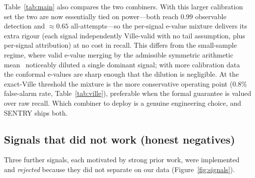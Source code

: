 \documentclass[10pt,journal,compsoc]{IEEEtran}
\theoremstyle{plain}
\theoremstyle{definition}
\begin{document}
Table~\ref{tab:main} also compares the two combiners. With this larger
calibration set the two are now essentially tied on power---both reach
\(0.99\) observable detection and \(\approx\!0.65\) all-attempts---so the
per-signal e-value mixture delivers its extra rigour (each signal
independently Ville-valid with no tail assumption, plus per-signal
attribution) at no cost in recall. This differs from the small-sample regime,
where valid e-value merging by the admissible symmetric arithmetic
mean~\cite{vovk2021evalues} noticeably diluted a single dominant signal; with
more calibration data the conformal e-values are sharp enough that the
dilution is negligible. At the exact-Ville threshold the mixture is the more
conservative operating point (\(0.8\%\) false-alarm rate, Table~\ref{tab:ville}),
preferable when the formal guarantee is valued over raw recall. Which combiner
to deploy is a genuine engineering choice, and SENTRY ships both.

\subsection{Signals that did not work (honest negatives)}\label{sec:negatives}

Three further signals, each motivated by strong prior work, were implemented
and \emph{rejected} because they did not separate on our data
(Figure~\ref{fig:signals}).
\end{document}
